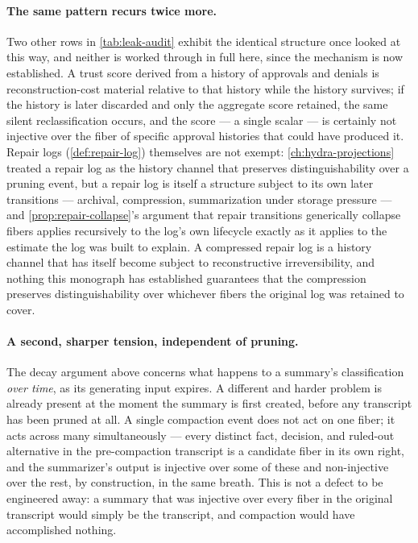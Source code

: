\documentclass[11pt]{book}
\theoremstyle{plain}
\theoremstyle{definition}
\theoremstyle{remark}
\begin{document}
\paragraph{The same pattern recurs twice more.} Two other rows in
\cref{tab:leak-audit} exhibit the identical structure once looked at
this way, and neither is worked through in full here, since the
mechanism is now established. A trust score derived from a history of
approvals and denials is reconstruction-cost material relative to that
history while the history survives; if the history is later discarded
and only the aggregate score retained, the same silent reclassification
occurs, and the score --- a single scalar --- is certainly not
injective over the fiber of specific approval histories that could
have produced it. Repair logs (\cref{def:repair-log}) themselves are
not exempt: \cref{ch:hydra-projections} treated a repair log as the
history channel that preserves distinguishability over a pruning
event, but a repair log is itself a structure subject to its own
later transitions --- archival, compression, summarization under
storage pressure --- and \cref{prop:repair-collapse}'s argument that
repair transitions generically collapse fibers applies recursively to
the log's own lifecycle exactly as it applies to the estimate the log
was built to explain. A compressed repair log is a history channel
that has itself become subject to reconstructive irreversibility,
and nothing this monograph has established guarantees that the
compression preserves distinguishability over whichever fibers the
original log was retained to cover.

\paragraph{A second, sharper tension, independent of pruning.} The
decay argument above concerns what happens to a summary's
classification \emph{over time}, as its generating input expires. A
different and harder problem is already present at the moment the
summary is first created, before any transcript has been pruned at
all. A single compaction event does not act on one fiber; it acts
across many simultaneously --- every distinct fact, decision, and
ruled-out alternative in the pre-compaction transcript is a candidate
fiber in its own right, and the summarizer's output is injective over
some of these and non-injective over the rest, by construction, in the
same breath. This is not a defect to be engineered away: a summary
that was injective over every fiber in the original transcript would
simply be the transcript, and compaction would have accomplished
nothing.
\end{document}
